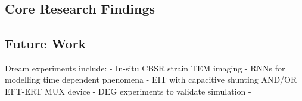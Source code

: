 \chapter{\chapixname}
\label{chapter9}

\section{Core Research Findings}

\section{Future Work}
Dream experiments include:
- In-situ CBSR strain TEM imaging
- RNNs for modelling time dependent phenomena
- EIT with capacitive shunting AND/OR EFT-ERT MUX device
- DEG experiments to validate simulation
- 


